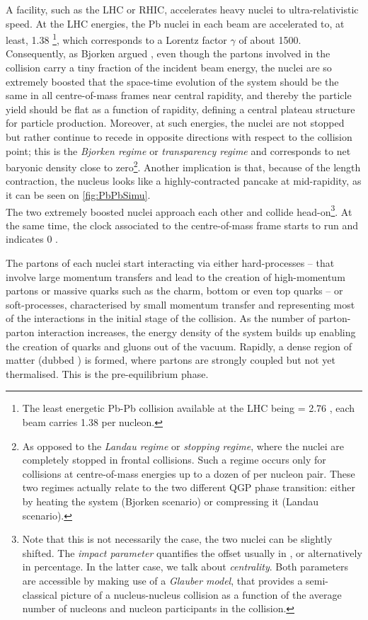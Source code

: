 A facility, such as the LHC or RHIC, accelerates heavy nuclei to ultra-relativistic speed. At the LHC energies, the Pb nuclei in each beam are accelerated to, at least, 1.38 \tev\footnote{The least energetic Pb-Pb collision available at the LHC being \sqrtSnn = 2.76 \tev, each beam carries 1.38 \tev per nucleon.}, which corresponds to a Lorentz factor $\gamma$ of about 1500. Consequently, as Bjorken argued \cite{bjorkenHighlyRelativisticNucleusnucleus1983}, even though the partons involved in the collision carry a tiny fraction of the incident beam energy, the nuclei are so extremely boosted that the space-time evolution of the system should be the same in all centre-of-mass frames near central rapidity, and thereby the particle yield should be flat as a function of rapidity, defining a central plateau structure for particle production. Moreover, at such energies, the nuclei are not stopped but rather continue to recede in opposite directions with respect to the collision point; this is the \textit{Bjorken regime} or \textit{transparency regime} and corresponds to net baryonic density close to zero\footnote{As opposed to the \textit{Landau regime} or \textit{stopping regime}, where the nuclei are completely stopped in frontal collisions. Such a regime occurs only for collisions at centre-of-mass energies up to a dozen of \gev per nucleon pair. These two regimes actually relate to the two different QGP phase transition: either by heating the system (Bjorken scenario) or compressing it (Landau scenario).}. Another implication is that, because of the length contraction, the nucleus looks like a highly-contracted pancake at mid-rapidity, as it can be seen on \fig\ref{fig:PbPbSimu}.\\

The two extremely boosted nuclei approach each other and collide head-on\footnote{Note that this is not necessarily the case, the two nuclei can be slightly shifted. The \textit{impact parameter} quantifies the offset usually in \fm, or alternatively in percentage. In the latter case, we talk about \textit{centrality}. Both parameters are accessible by making use of a \textit{Glauber model}, that provides a semi-classical picture of a nucleus-nucleus collision as a function of the average number of nucleons and nucleon participants in the collision.}. At the same time, the clock associated to the centre-of-mass frame starts to run and indicates 0 \fmC. 

The partons of each nuclei start interacting via either hard-processes -- that involve large momentum transfers and lead to the creation of high-momentum partons or massive quarks such as the charm, bottom or even top quarks -- or soft-processes, characterised by small momentum transfer and representing most of the interactions in the initial stage of the collision. As the number of parton-parton interaction increases, the energy density of the system builds up enabling the creation of quarks and gluons out of the vacuum. Rapidly, a dense region of matter (dubbed ) is formed, where partons are strongly coupled but not yet thermalised. This is the pre-equilibrium phase.

